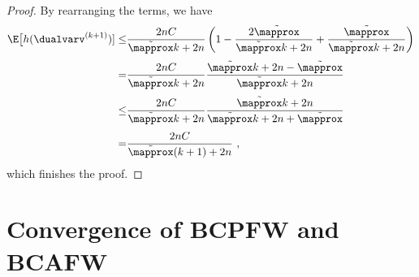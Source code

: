 \documentclass{article}
\begin{document}
\begin{proof}
By rearranging the terms, we have
\begin{align*}
    \E\big[ h(\dualvarv^{(k+1)})] \le& \frac{2nC}{\tilde{\mapprox} k+2n} \left(1 - \frac{2\tilde{\mapprox}}{\tilde{\mapprox} k+2n} + \frac{\tilde{\mapprox}}{\tilde{\mapprox} k+2n}\right) \\[3pt]
                      =& \frac{2nC}{\tilde{\mapprox} k+2n} \frac{\tilde{\mapprox} k+2n-\tilde{\mapprox}}{\tilde{\mapprox} k+2n} \\[3pt]
                     \le& \frac{2nC}{\tilde{\mapprox} k+2n} \frac{\tilde{\mapprox} k+2n}{\tilde{\mapprox} k+2n+\tilde{\mapprox}} \\[3pt]
                      =& \frac{2nC}{\tilde{\mapprox} (k+1)+2n} \ ,
\end{align*}  
which finishes the proof.
%
%
%
%
%
%
%
%
\end{proof}








%
%
%
%
%
%
%
%
%
%
%
%
%
%
%
%
%
%
%
%
%
%
%
%
%
%
%
%
%
%
%
%
%
%
%
%
%
%
%
%
%
%
%
%
%
%
%
%
%
%
%
%
%
%
%
%
%
%
%
%
%
%
%
%
%
%
%
%
%
%
%
%
%
%
%
%
%
%
%
%
%
%
%
%
%
%
%
%
%
%
%
%
%
%
%
%
%
%
%
%
%
%
%
%
%
%
%
%
%
%
%
%
%
%
%
%
%
%
%
%
%
%
%
%
%
%
%
%
%
%
%
%
%
%
%
%
%
%
%
%
%
%
%
%
%
%
%
%
%
%
%
%
%
%
%
%
%
%
%
%
%
%
%
%
%
%
%
%
%
%
%
%
%
%
%
%
%
%
%
%
%
%
%
%
%
%
%
%
%
%
%
%
%
%
%
%
%
%
%
%
%
%
%
%
%
%
%
%
%
%
%
%
%
%
%
%
%
%
%
%
%
%
%
%
%
%
%
%
%
%
%
%
%
%
%
%
%
%
%
%
%
%
%
%
%
%
%
%
%
%
%
%
%
%
%
%
%
%
%
%
%
%
%
%
%
%
%
%
%
%
%
%
%
%
%
%
%
%



\section{Convergence of BCPFW and BCAFW} \label{app:BCPFWconvergence}
\end{document}
